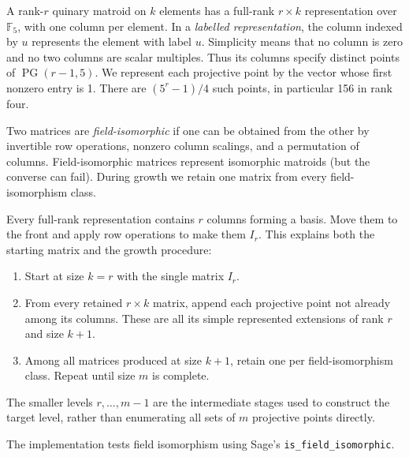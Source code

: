\documentclass[11pt,a4paper]{article}
\theoremstyle{definition}
\newcommand{\F}{\mathbb F_5}
\newcommand{\PG}{\operatorname{PG}}
\begin{document}
A rank-$r$ quinary matroid on $k$ elements has a full-rank
$r\times k$ representation over $\F$, with one column per element.
In a \emph{labelled representation}, the column indexed by $u$
represents the element with label $u$.
Simplicity means that no column is zero and no two columns are
scalar multiples. Thus its columns specify distinct points of
$\PG(r-1,5)$. We represent each projective point by the vector whose
first nonzero entry is 1. There are $(5^r-1)/4$ such points, in
particular 156 in rank four.

Two matrices are \emph{field-isomorphic} if one can be obtained from
the other by invertible row operations, nonzero column scalings,
and a permutation of columns. Field-isomorphic matrices represent
isomorphic matroids (but the converse can fail). During growth we
retain one matrix from every field-isomorphism class. %

Every full-rank representation contains $r$ columns forming a basis.
Move them to the front and apply row operations to make them $I_r$.
This explains both the starting matrix and the growth procedure:
\begin{enumerate}
\item Start at size $k=r$ with the single matrix $I_r$.
\item From every retained $r\times k$ matrix, append each projective
point not already among its columns. These are all its simple
represented extensions of rank $r$ and size $k+1$.
\item Among all matrices produced at size $k+1$, retain one per
field-isomorphism class. Repeat until size $m$ is complete.
\end{enumerate}
The smaller levels $r,\ldots,m-1$ are the intermediate
stages used to construct the target level, rather than enumerating
all sets of $m$ projective points directly.

The implementation tests field isomorphism using Sage's
\texttt{is\_field\_isomorphic}. %
\end{document}
